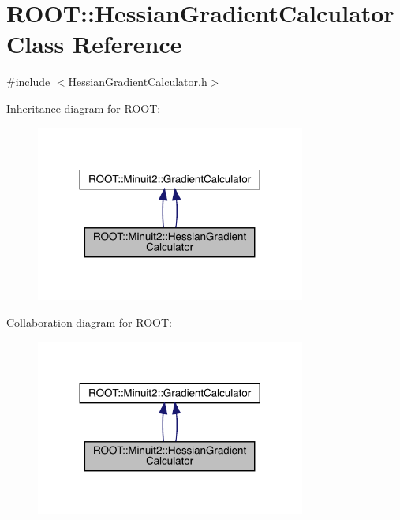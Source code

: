 \hypertarget{classROOT_1_1Minuit2_1_1HessianGradientCalculator}{}\section{R\+O\+OT\+:\+:Hessian\+Gradient\+Calculator Class Reference}
\label{classROOT_1_1Minuit2_1_1HessianGradientCalculator}


{\ttfamily \#include $<$Hessian\+Gradient\+Calculator.\+h$>$}



Inheritance diagram for R\+O\+OT\+:\nopagebreak
\begin{figure}[H]
\begin{center}
\leavevmode
\includegraphics[width=251pt]{d2/dbb/classROOT_1_1Minuit2_1_1HessianGradientCalculator__inherit__graph}
\end{center}
\end{figure}


Collaboration diagram for R\+O\+OT\+:\nopagebreak
\begin{figure}[H]
\begin{center}
\leavevmode
\includegraphics[width=251pt]{db/d76/classROOT_1_1Minuit2_1_1HessianGradientCalculator__coll__graph}
\end{center}
\end{figure}
